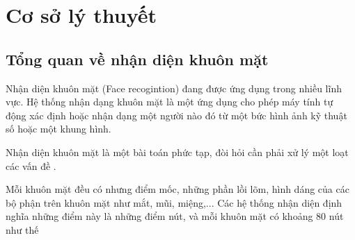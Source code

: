 \chapter{Cơ sở lý thuyết}
\label{cha:chap2}

\section{Tổng quan về nhận diện khuôn mặt}

Nhận diện khuôn mặt (Face recogintion) đang được ứng dụng trong nhiều lĩnh vực.
Hệ thống nhận dạng khuôn mặt là một ứng dụng cho phép máy tính tự động xác định
hoặc nhận dạng một người nào đó từ một bức hình ảnh kỹ thuật số hoặc một khung
hình.

Nhận diện khuôn mặt là một bài toán phức tạp, đòi hỏi cần phải xử lý một
loạt các vấn đề .

Mỗi khuôn mặt đều có nhưng điểm mốc, những phần lồi lõm, hình dáng của các
bộ phận trên khuôn mặt như mắt, mũi, miệng,... Các hệ thống nhận diện định
nghĩa những điểm này là những điểm nút, và mỗi khuôn mặt có khoảng 80 nút như thế




